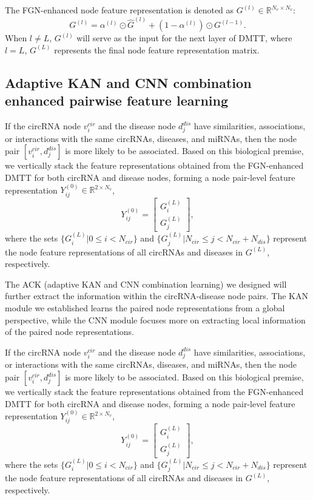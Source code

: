 \documentclass[journal=jcisd8,manuscript=article]{achemso}
\begin{document}
The FGN-enhanced node feature representation is denoted as ${G}^{(l)} \in \mathbb{R}^{N_v \times N_v}$:
\begin{equation}
    {G}^{(l)} =  \alpha^{(l)} \odot \hat{G}^{(l)} + (1 - \alpha^{(l)}) \odot G^{(l - 1)}.
\end{equation}
When $l \neq L$, $G^{(l)}$ will serve as the input for the next layer of DMTT, where $l = L$, $G^{(L)}$ represents the final node feature representation matrix.
\vspace{-0.5cm}

\subsection{Adaptive KAN and CNN combination enhanced pairwise feature learning}
\vspace{-0.3cm}
If the circRNA node $v_i^{cir}$ and the disease node $d_j^{dis}$ have similarities, associations, or interactions with the same circRNAs, diseases, and miRNAs, then the node pair $[v_i^{cir}, d_j^{dis}]$ is more likely to be associated. Based on this biological premise, we vertically stack the feature representations obtained from the FGN-enhanced DMTT for both circRNA and disease nodes, forming a node pair-level feature representation ${Y_{ij}^{(0)}} \in \mathbb{R}^{2 \times N_v}$,
\begin{equation}
    {Y_{ij}^{(0)}} = \begin{bmatrix} {G^{(L)}_i} \\ {G^{(L)}_j} \end{bmatrix},
\end{equation}
where the sets $\{G^{(L)}_{i} | 0 \leqslant i < N_{cir}\}$ and $\{G^{(L)}_j | N_{cir} \leqslant j < N_{cir} + N_{dis}\}$ represent the node feature representations of all circRNAs and diseases in $G^{(L)}$, respectively.

The ACK (adaptive KAN and CNN combination learning) we designed will further extract the information within the circRNA-disease node pairs. The KAN module we established learns the paired node representations from a global perspective, while the CNN module focuses more on extracting local information of the paired node representations.

If the circRNA node $v_i^{cir}$ and the disease node $d_j^{dis}$ have similarities, associations, or interactions with the same circRNAs, diseases, and miRNAs, then the node pair $[v_i^{cir}, d_j^{dis}]$ is more likely to be associated. Based on this biological premise, we vertically stack the feature representations obtained from the FGN-enhanced DMTT for both circRNA and disease nodes, forming a node pair-level feature representation ${Y_{ij}^{(0)}} \in \mathbb{R}^{2 \times N_v}$,
\begin{equation}
    {Y_{ij}^{(0)}} = \begin{bmatrix} {G^{(L)}_i} \\ {G^{(L)}_j} \end{bmatrix},
\end{equation}
where the sets $\{G^{(L)}_{i} | 0 \leqslant i < N_{cir}\}$ and $\{G^{(L)}_j | N_{cir} \leqslant j < N_{cir} + N_{dis}\}$ represent the node feature representations of all circRNAs and diseases in $G^{(L)}$, respectively.
\end{document}
